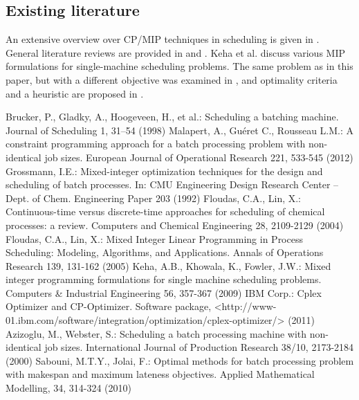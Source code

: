 \documentclass[12pt, landscape]{article}
\begin{document}
\subsection{Existing literature}
An extensive overview over CP/MIP techniques in scheduling is given in \cite{grossmann}. General literature reviews are provided in \cite{floudas1} and \cite{floudas2}. Keha et al. \cite{keha} discuss various MIP formulations for single-machine scheduling problems. The same problem as in this paper, but with a different objective was examined in \cite{azizoglu}, and optimality criteria and a heuristic are proposed in \cite{sabouni}. 

\pagebreak
\begin{thebibliography}{5}
 Brucker, P., Gladky, A., Hoogeveen, H., et al.: Scheduling a batching machine. Journal of Scheduling 1, 31–54 (1998)
 Malapert, A., Guéret C., Rousseau L.M.: A constraint programming approach for a batch processing problem with non-identical job sizes. European Journal of Operational Research 221, 533-545 (2012)
 Grossmann, I.E.: Mixed-integer optimization techniques for the design and scheduling of batch processes. In: CMU Engineering Design Research Center -- Dept. of Chem. Engineering Paper 203 (1992)
 Floudas, C.A., Lin, X.: Continuous-time versus discrete-time approaches for scheduling of chemical processes: a review. Computers and Chemical Engineering 28, 2109-2129 (2004)
 Floudas, C.A., Lin, X.: Mixed Integer Linear Programming in Process Scheduling: Modeling, Algorithms, and Applications. Annals of Operations Research 139, 131-162 (2005)
 Keha, A.B., Khowala, K., Fowler, J.W.: Mixed integer programming formulations for single machine scheduling problems. Computers \& Industrial Engineering 56, 357-367 (2009)
 IBM Corp.: Cplex Optimizer and CP-Optimizer. Software package, <http://www-01.ibm.com/software/integration/optimization/cplex-optimizer/> (2011)
 Azizoglu, M., Webster, S.: Scheduling a batch processing machine with non-identical job sizes. International Journal of Production Research 38/10, 2173-2184 (2000)
 Sabouni, M.T.Y., Jolai, F.: Optimal methods for batch processing problem with makespan and maximum lateness objectives. Applied Mathematical Modelling, 34, 314-324 (2010)


\end{thebibliography}
 
\end{document}
